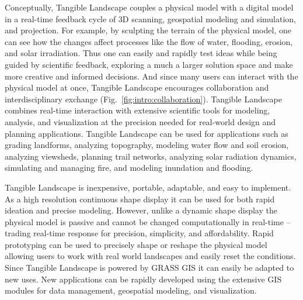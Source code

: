 \documentclass{article}
\begin{document}
%
Conceptually, Tangible Landscape couples a physical model with a digital model in a real-time feedback cycle of 3D scanning, geospatial modeling and simulation, and projection. For example, by sculpting the terrain of the physical model, one can see how the changes affect processes like the flow of water, flooding, erosion, and solar irradiation. Thus one can easily and rapidly test ideas while being guided by scientific feedback, exploring a much a larger solution space and make more creative and informed decisions. And since many users can interact with the physical model at once, Tangible Landscape encourages collaboration and interdisciplinary exchange (Fig.~\ref{fig:intro:collaboration}). Tangible Landscape combines real-time interaction with extensive scientific tools for modeling, analysis, and visualization at the precision needed for real-world design and planning applications. 
Tangible Landscape can be used for applications such as 
grading landforms, 
analyzing topography, 
modeling water flow and soil erosion, 
analyzing viewsheds, 
planning trail networks, 
analyzing solar radiation dynamics, 
simulating and managing fire, 
and modeling inundation and flooding. 


Tangible Landscape is inexpensive, portable, adaptable, and easy to implement.
As a high resolution continuous shape display it can be used
for both rapid ideation and precise modeling.
However, unlike a dynamic shape display the physical model is passive
and cannot be changed computationally in real-time -- trading real-time response
for precision, simplicity, and affordability.
Rapid prototyping can be used to precisely shape or reshape the physical model
allowing users to work with real world landscapes and easily reset the conditions.
Since Tangible Landscape is powered by GRASS GIS it can easily be adapted to new uses. 
New applications can be rapidly developed using the extensive GIS modules for data management, geospatial modeling, and visualization. 
\end{document}
